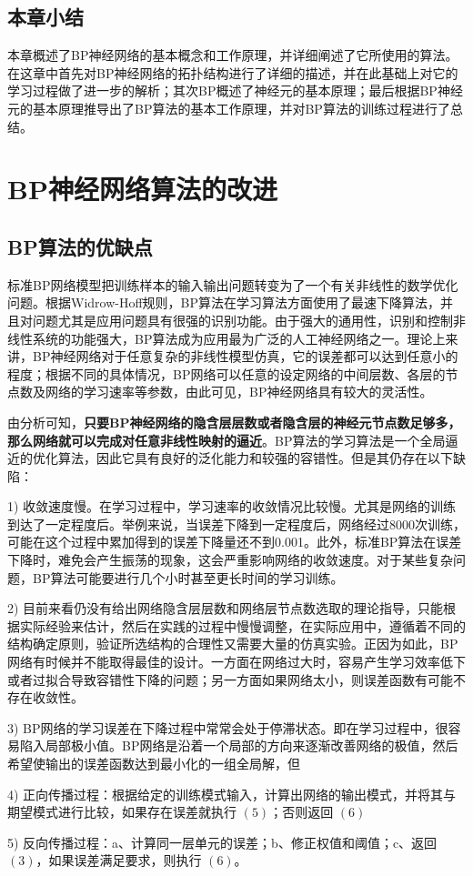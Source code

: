 \documentclass[UTF8]{ctexart}
\begin{document}
\subsection{本章小结}

本章概述了BP神经网络的基本概念和工作原理，并详细阐述了它所使用的算法。在这章中首先对BP神经网络的拓扑结构进行了详细的描述，并在此基础上对它的学习过程做了进一步的解析；其次BP概述了神经元的基本原理；最后根据BP神经元的基本原理推导出了BP算法的基本工作原理，并对BP算法的训练过程进行了总结。

\section{BP神经网络算法的改进}

\subsection{BP算法的优缺点}

标准BP网络模型把训练样本的输入输出问题转变为了一个有关非线性的数学优化问题。根据Widrow-Hoff规则，BP算法在学习算法方面使用了最速下降算法，并且对问题尤其是应用问题具有很强的识别功能。由于强大的通用性，识别和控制非线性系统的功能强大，BP算法成为应用最为广泛的人工神经网络之一。理论上来讲，BP神经网络对于任意复杂的非线性模型仿真，它的误差都可以达到任意小的程度；根据不同的具体情况，BP网络可以任意的设定网络的中间层数、各层的节点数及网络的学习速率等参数，由此可见，BP神经网络具有较大的灵活性。 \par

由分析可知，\textbf{只要BP神经网络的隐含层层数或者隐含层的神经元节点数足够多，那么网络就可以完成对任意非线性映射的逼近}。BP算法的学习算法是一个全局逼近的优化算法，因此它具有良好的泛化能力和较强的容错性。但是其仍存在以下缺陷： \par

\item [1)]
收敛速度慢。在学习过程中，学习速率的收敛情况比较慢。尤其是网络的训练到达了一定程度后。举例来说，当误差下降到一定程度后，网络经过8000次训练，可能在这个过程中累加得到的误差下降量还不到0.001。此外，标准BP算法在误差下降时，难免会产生振荡的现象，这会严重影响网络的收敛速度。对于某些复杂问题，BP算法可能要进行几个小时甚至更长时间的学习训练。
\item [2)]
目前来看仍没有给出网络隐含层层数和网络层节点数选取的理论指导，只能根据实际经验来估计，然后在实践的过程中慢慢调整，在实际应用中，遵循着不同的结构确定原则，验证所选结构的合理性又需要大量的仿真实验。正因为如此，BP网络有时候并不能取得最佳的设计。一方面在网络过大时，容易产生学习效率低下或者过拟合导致容错性下降的问题；另一方面如果网络太小，则误差函数有可能不存在收敛性。
\item [3)]
BP网络的学习误差在下降过程中常常会处于停滞状态。即在学习过程中，很容易陷入局部极小值。BP网络是沿着一个局部的方向来逐渐改善网络的极值，然后希望使输出的误差函数达到最小化的一组全局解，但
\item [4)]
正向传播过程：根据给定的训练模式输入，计算出网络的输出模式，并将其与期望模式进行比较，如果存在误差就执行 $(5)$；否则返回 $(6)$
\item [5)]
反向传播过程：a、计算同一层单元的误差；b、修正权值和阈值；c、返回 $(3)$，如果误差满足要求，则执行 $(6)$。
\end{document}
